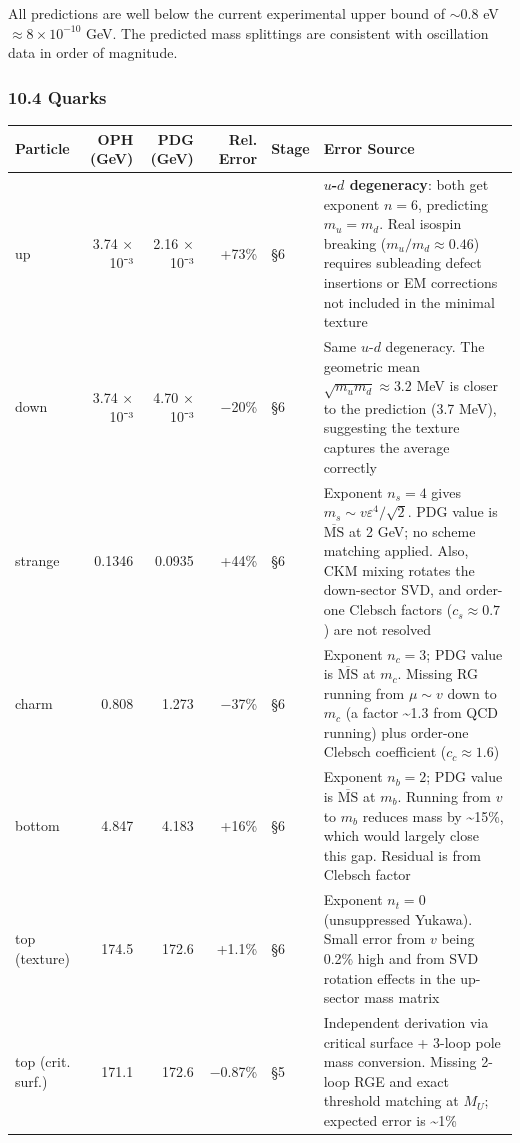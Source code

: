All predictions are well below the current experimental upper bound of \(\sim 0.8\) eV \(\approx 8 \times 10^{-10}\) GeV. The predicted mass splittings are consistent with oscillation data in order of magnitude.

\subsubsection{10.4 Quarks}\label{104-quarks}

{\def\LTcaptype{none} %
\begin{longtable}[]{@{}lrrrll@{}}
\toprule\noalign{}
Particle & OPH (GeV) & PDG (GeV) & Rel. Error & Stage & Error Source \\
\midrule\noalign{}
\endhead
\bottomrule\noalign{}
\endlastfoot
up & 3.74 × 10⁻³ & 2.16 × 10⁻³ & +73\% & §6 & \textbf{\(u\)-\(d\) degeneracy}: both get exponent \(n=6\), predicting \(m_u = m_d\). Real isospin breaking (\(m_u/m_d \approx 0.46\)) requires subleading defect insertions or EM corrections not included in the minimal texture \\
down & 3.74 × 10⁻³ & 4.70 × 10⁻³ & −20\% & §6 & Same \(u\)-\(d\) degeneracy. The geometric mean \(\sqrt{m_u m_d} \approx 3.2\) MeV is closer to the prediction (3.7 MeV), suggesting the texture captures the average correctly \\
strange & 0.1346 & 0.0935 & +44\% & §6 & Exponent \(n_s = 4\) gives \(m_s \sim v \varepsilon^4 / \sqrt{2}\). PDG value is \(\overline{\text{MS}}\) at 2 GeV; no scheme matching applied. Also, CKM mixing rotates the down-sector SVD, and order-one Clebsch factors (\(c_s \approx 0.7\)) are not resolved \\
charm & 0.808 & 1.273 & −37\% & §6 & Exponent \(n_c = 3\); PDG value is \(\overline{\text{MS}}\) at \(m_c\). Missing RG running from \(\mu \sim v\) down to \(m_c\) (a factor \textasciitilde1.3 from QCD running) plus order-one Clebsch coefficient (\(c_c \approx 1.6\)) \\
bottom & 4.847 & 4.183 & +16\% & §6 & Exponent \(n_b = 2\); PDG value is \(\overline{\text{MS}}\) at \(m_b\). Running from \(v\) to \(m_b\) reduces mass by \textasciitilde15\%, which would largely close this gap. Residual is from Clebsch factor \\
top (texture) & 174.5 & 172.6 & +1.1\% & §6 & Exponent \(n_t = 0\) (unsuppressed Yukawa). Small error from \(v\) being 0.2\% high and from SVD rotation effects in the up-sector mass matrix \\
top (crit. surf.) & 171.1 & 172.6 & −0.87\% & §5 & Independent derivation via critical surface + 3-loop pole mass conversion. Missing 2-loop RGE and exact threshold matching at \(M_U\); expected error is \textasciitilde1\% \\
\end{longtable}
}

